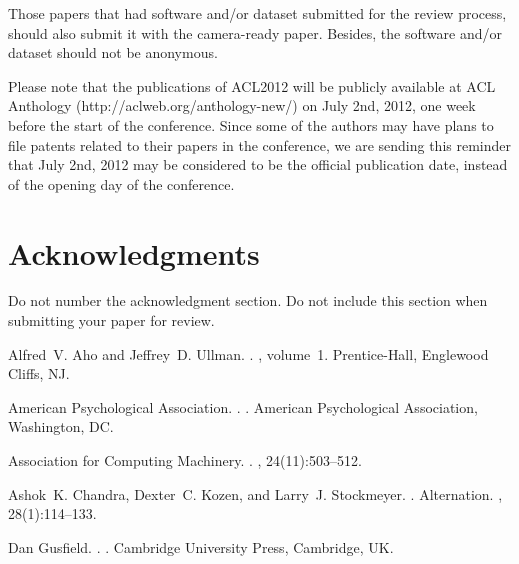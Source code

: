 \documentclass[11pt]{article}
\begin{document}
Those papers that had software and/or dataset submitted for the review process, should also submit it 
with the camera-ready paper. Besides, the software and/or dataset should not be anonymous. 

Please note that the publications of ACL2012 will be publicly available at ACL Anthology 
(http://aclweb.org/anthology-new/) on July 2nd, 2012, one week before the start of the conference. 
Since some of the authors may have plans to file patents related to their papers in the conference, 
we are sending this reminder that July 2nd, 2012 may be considered to be the official publication date, 
instead of the opening day of the conference.

\section*{Acknowledgments}

Do not number the acknowledgment section. Do not include this section when submitting your paper for review.

\begin{thebibliography}{}

Alfred~V. Aho and Jeffrey~D. Ullman.
.
, volume~1.
\newblock Prentice-{Hall}, Englewood Cliffs, NJ.

{American Psychological Association}.
.
.
\newblock American Psychological Association, Washington, DC.

{Association for Computing Machinery}.
.
, 24(11):503--512.

Ashok~K. Chandra, Dexter~C. Kozen, and Larry~J. Stockmeyer.
.
\newblock Alternation.
,
  28(1):114--133.

Dan Gusfield.
.
.
\newblock Cambridge University Press, Cambridge, UK.

\end{thebibliography}
\end{document}
